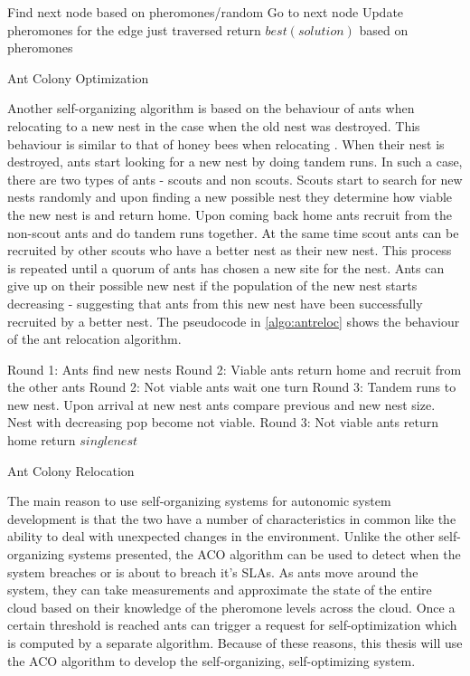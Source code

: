 \begin{algorithm}
\begin{algorithmic}
	\State Find next node based on pheromones/random
	\State Go to next node
	\State Update pheromones for the edge just traversed
\EndWhile
\State return $best(solution)$ based on pheromones
\end{algorithmic}
\caption{Ant Colony Optimization}\label{algo:aco}
\end{algorithm}

Another self-organizing algorithm is based on the behaviour of ants when relocating to a new nest in the case when the old nest was destroyed. This behaviour is similar to that of honey bees when relocating \cite{selforg:antreloc}. When their nest is destroyed, ants start looking for a new nest by doing tandem runs. In such a case, there are two types of ants - scouts and non scouts. Scouts start to search for new nests randomly and upon finding a new possible nest they determine how viable the new nest is and return home. Upon coming back home ants recruit from the non-scout ants and do tandem runs together. At the same time scout ants can be recruited by other scouts who have a better nest as their new nest. This process is repeated until a quorum of ants has chosen a new site for the nest. Ants can give up on their possible new nest if the population of the new nest starts decreasing - suggesting that ants from this new nest have been successfully recruited by a better nest. The pseudocode in \ref{algo:antreloc} shows the behaviour of the ant relocation algorithm.

\begin{algorithm}
\begin{algorithmic}
\State Round 1: Ants find new nests
	\State Round 2: Viable ants return home and recruit from the other ants
	\State Round 2: Not viable ants wait one turn
	\State Round 3: Tandem runs to new nest. Upon arrival at new nest ants compare previous and new nest size. Nest with decreasing pop become not viable. 
	\State Round 3: Not viable ants return home
\EndWhile
\State return $single nest$
\end{algorithmic}
\caption{Ant Colony Relocation}\label{algo:antreloc}
\end{algorithm}

The main reason to use self-organizing systems for autonomic system development is that the two have a number of characteristics in common like the ability to deal with unexpected changes in the environment. Unlike the other self-organizing systems presented, the ACO algorithm can be used to detect when the system breaches or is about to breach it's SLAs. As ants move around the system, they can take measurements and approximate the state of the entire cloud based on their knowledge of the pheromone levels across the cloud. Once a certain threshold is reached ants can trigger a request for self-optimization which is computed by a separate algorithm. Because of these reasons, this thesis will use the ACO algorithm to develop the self-organizing, self-optimizing system.

